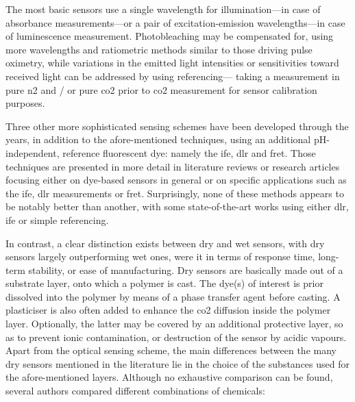 The most basic sensors use a single wavelength for illumination---in case of absorbance measurements---or a pair of excitation-emission wavelengths---in case of luminescence measurement. Photobleaching may be compensated for, using more wavelengths and ratiometric methods similar to those driving pulse oximetry\cite{vurek1983, uttamlal1995, degrandpre1999, ge2003, lu2008, hakonen2008, ge2014, wang2020}, while variations in the emitted light intensities or sensitivities toward received light can be addressed by using referencing---\ie{} taking a measurement in pure \gls{n2} and / or pure \gls{co2} prior to \gls{co2} measurement for sensor calibration purposes\cite{opitz1984, zhujun1984b, wolfbeis1988, he1995, marazuela1995, mills1997, malins1998, wolfbeis1998, segawa2003, oter2006, fernandezsanchez2007, oter2008, chu2008, chu2009, dansby2010, chu2017, perez2017}.

Three other more sophisticated sensing schemes have been developed through the years, in addition to the afore-mentioned techniques, using an additional pH-independent, reference fluorescent dye: namely the \gls{ife}, \gls{dlr} and \gls{fret}. Those techniques are presented in more detail in literature reviews or research articles focusing either on dye-based sensors in general\cite{mills2009, clarke2017} or on specific applications such as the \gls{ife}\cite{nakamura2003, amao2004, amao2005a, amao2005b, perez2009, aguayolopez2014, fernandezramos2018, fernandezramos2019}, \gls{dlr} measurements\cite{klimant2001_pap, bultzingslowen2002, burke2006, cajlakovic2006, fritzsche2017, staudinger2018, pfeifer2020} or \gls{fret}\cite{lakowicz1993, neurauter1999, valeur2001_chap9, bultzingslowen2003}. Surprisingly, none of these methods appears to be notably better than another, with some state-of-the-art works using either \gls{dlr}\cite{pfeifer2020}, \gls{ife}\cite{fernandezramos2018} or simple referencing\cite{chu2017}.

In contrast, a clear distinction exists between dry and wet sensors, with dry sensors largely outperforming wet ones, were it in terms of response time, long-term stability, or ease of manufacturing\cite{wolfbeis2005, mills2009}. Dry sensors are basically made out of a substrate layer, onto which a polymer is cast. The dye(s) of interest is prior dissolved into the polymer by means of a phase transfer agent before casting. A plasticiser is also often added to enhance the \gls{co2} diffusion inside the polymer layer. Optionally, the latter may be covered by an additional protective layer, so as to prevent ionic contamination, or destruction of the sensor by acidic vapours. Apart from the optical sensing scheme, the main differences between the many dry sensors mentioned in the literature lie in the choice of the substances used for the afore-mentioned layers. Although no exhaustive comparison can be found, several authors compared different combinations of chemicals:

